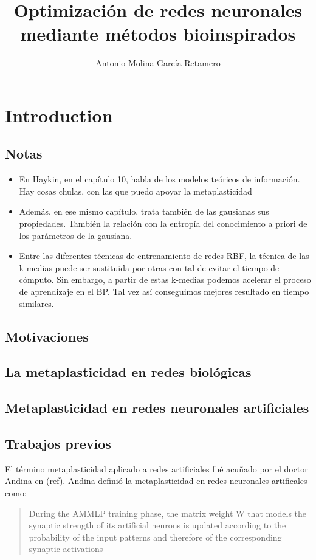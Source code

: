 \documentclass[10pt,a4paper, twocolumn]{report}
\author{Antonio Molina García-Retamero}
\title{Optimización de redes neuronales mediante métodos bioinspirados}
\begin{document}
\onecolumn
\maketitle
\pagebreak
\tableofcontents
\pagebreak
\twocolumn

\chapter{Introduction}
\section{Notas}
\begin{itemize}
	\item En Haykin, en el capítulo 10, habla de los modelos teóricos de información. Hay cosas chulas, con las que puedo apoyar la metaplasticidad
	 \item Además, en ese mismo capítulo, trata también de las gausianas sus propiedades. También la relación con la entropía del conocimiento a priori de los parámetros de la gausiana.
	 \item Entre las diferentes técnicas de entrenamiento de redes RBF, la técnica de las k-medias puede ser sustituida por otras con tal de evitar el tiempo de cómputo. Sin embargo, a partir de estas k-medias podemos acelerar el proceso de aprendizaje en el BP. Tal vez así conseguimos mejores resultado en tiempo similares.
\end{itemize}

\section{Motivaciones}

\section{La metaplasticidad en redes biológicas}

\section{Metaplasticidad en redes neuronales artificiales}
\section{Trabajos previos}
El término metaplasticidad aplicado a redes artificiales fué acuñado por el doctor Andina en (ref). Andina definió la metaplasticidad en redes neuronales artificales como:
\begin{quote}
During the AMMLP training phase, the matrix weight W that models the synaptic strength of its artificial neurons is updated according to the probability of the input patterns and therefore of the corresponding synaptic activations
\end{quote}
\end{document}
